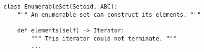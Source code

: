 \begin{verbatim}
class EnumerableSet(Setoid, ABC):
    """ An enumerable set can construct its elements. """

    def elements(self) -> Iterator:
        """ This iterator could not terminate. """
        ...
\end{verbatim}